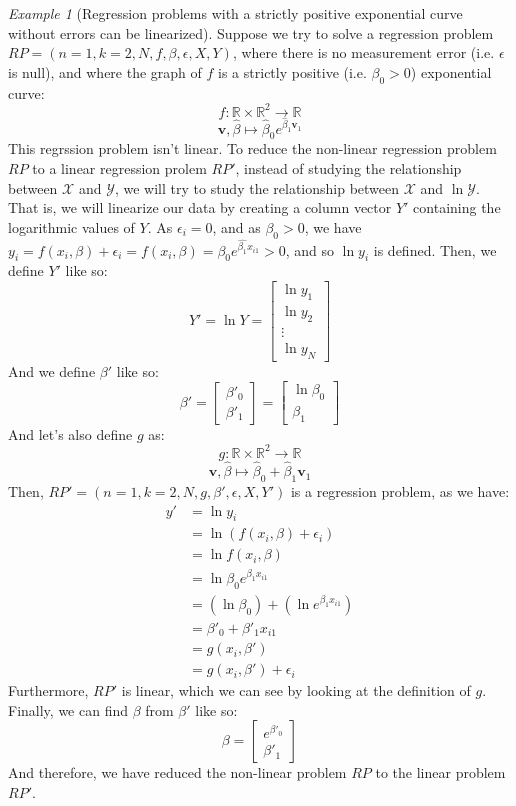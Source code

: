 \documentclass{article}
\theoremstyle{definition}
\theoremstyle{remark}
\theoremstyle{example}
\newtheorem{example}{Example}[section]
\newcommand{\vv}{\mathbf{v}}
\newcommand{\fvector}[2]{\begin{bmatrix} #1_1 \\ #1_2 \\ \vdots \\ #1_{#2} \end{bmatrix}}
\begin{document}
\begin{example}[Regression problems with a strictly positive exponential curve without errors can be linearized]
		Suppose we try to solve a regression problem $RP = (n=1, k=2, N, f, \beta, \epsilon, X, Y)$, where there is no measurement error (i.e. $\epsilon$ is null), and where the graph of $f$ is a strictly positive (i.e. $\beta_0 > 0$) exponential curve:
				$$f : \mathbb{R} \times \mathbb{R}^2 \rightarrow \mathbb{R}$$
				$$\vv, \hat{\beta} \mapsto \hat{\beta}_0 e^{\hat{\beta}_1 \vv_1}$$
		This regrssion problem isn't linear. To reduce the non-linear regression problem $RP$ to a linear regression prolem $RP'$, instead of studying the relationship between $\mathcal{X}$ and $\mathcal{Y}$, we will try to study the relationship between $\mathcal{X}$ and $\ln \mathcal{Y} $. That is, we will linearize our data by creating a column vector $Y'$ containing the logarithmic values of $Y$. As $\epsilon_i = 0$, and as $\beta_0 > 0$, we have $y_i = f(x_i, \beta) + \epsilon_i = f(x_i, \beta) = \beta_0 e^{\hat{\beta_1} x_{i1}} > 0$, and so $\ln y_i$ is defined. Then, we define $Y'$ like so:
				$$Y' = \ln Y = \fvector{\ln y}{N}$$
		And we define $\beta'$ like so:
				$$\beta' = \begin{bmatrix} \beta'_0 \\ \beta'_1 \end{bmatrix} = \begin{bmatrix} \ln \beta_0 \\ \beta_1 \end{bmatrix}$$
		And let's also define $g$ as:
				$$g : \mathbb{R} \times \mathbb{R}^2 \rightarrow \mathbb{R}$$
				$$\vv, \hat{\beta} \mapsto \hat{\beta}_0 + \hat{\beta}_1 \vv_1$$
		Then, $RP' = (n=1, k=2, N, g, \beta', \epsilon, X, Y')$ is a regression problem, as we have:
		\begin{align*}
				y' &= \ln y_i\\
				   &= \ln (f(x_i, \beta) + \epsilon_i)\\
				   &= \ln f(x_i, \beta)\\
				   &= \ln \beta_0 e^{\beta_1 x_{i1}}\\
				   &= (\ln \beta_0) + (\ln e^{\beta_1 x_{i1}})\\
				   &= \beta'_0 + \beta'_1 x_{i1}\\
				   &= g(x_i, \beta')\\
				   &= g(x_i, \beta') + \epsilon_i
		\end{align*}
		Furthermore, $RP'$ is linear, which we can see by looking at the definition of $g$. Finally, we can find $\beta$ from $\beta'$ like so:
				$$\beta = \begin{bmatrix} e^{\beta'_0} \\ \beta'_1 \end{bmatrix}$$
		And therefore, we have reduced the non-linear problem $RP$ to the linear problem $RP'$.
\end{example}
\end{document}
